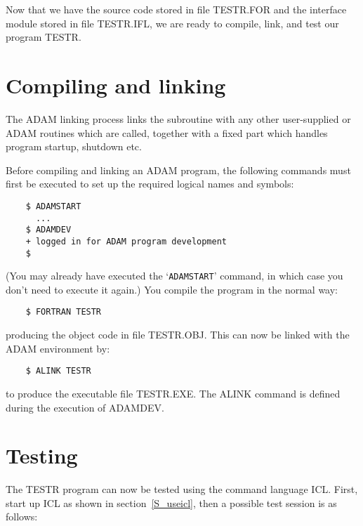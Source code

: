 Now that we have the source code stored in file TESTR.FOR and the interface
module stored in file TESTR.IFL, we are ready to compile, link, and test our
program TESTR.

\section{Compiling and linking}

The ADAM linking process links the subroutine with any other user-supplied
or ADAM routines which are called, together with a fixed part which
handles program startup, shutdown etc.

Before compiling and linking an ADAM program, the following commands must first
be executed to set up the required logical names and symbols:

\begin{small}
\begin{verbatim}
    $ ADAMSTART
      ...
    $ ADAMDEV
    + logged in for ADAM program development
    $
\end{verbatim}
\end{small}

(You may already have executed the `\verb+ADAMSTART+' command, in which case
you don't need to execute it again.)
You compile the program in the normal way:

\begin{small}
\begin{verbatim}
    $ FORTRAN TESTR
\end{verbatim}
\end{small}

producing the object code in file TESTR.OBJ.
This can now be linked with the ADAM environment by:

\begin{small}
\begin{verbatim}
    $ ALINK TESTR
\end{verbatim}
\end{small}

to produce the executable file TESTR.EXE.
The ALINK command is defined during the execution of ADAMDEV.

\section{Testing}

The TESTR program can now be tested using the command language ICL.
First, start up ICL as shown in section~\ref{S_useicl}, then a possible test
session is as follows:

